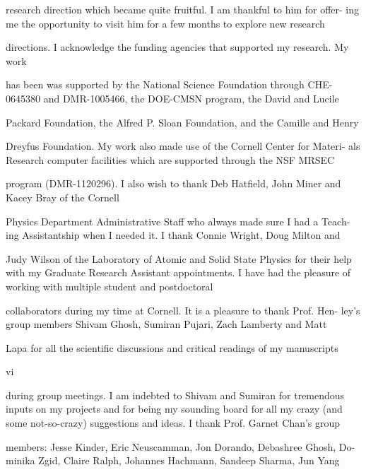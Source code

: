 \documentclass[phd,tocprelim]{cornell}
\begin{document}
\begin{acknowledgements}
research direction which became quite fruitful. I am thankful to him for offer-
ing me the opportunity to visit him for a few months to explore new research

directions.
I acknowledge the funding agencies that supported my research. My work

has been was supported by the National Science Foundation through CHE-
0645380 and DMR-1005466, the DOE-CMSN program, the David and Lucile

Packard Foundation, the Alfred P. Sloan Foundation, and the Camille and Henry

Dreyfus Foundation. My work also made use of the Cornell Center for Materi-
als Research computer facilities which are supported through the NSF MRSEC

program (DMR-1120296).
I also wish to thank Deb Hatfield, John Miner and Kacey Bray of the Cornell

Physics Department Administrative Staff who always made sure I had a Teach-
ing Assistantship when I needed it. I thank Connie Wright, Doug Milton and

Judy Wilson of the Laboratory of Atomic and Solid State Physics for their help
with my Graduate Research Assistant appointments.
I have had the pleasure of working with multiple student and postdoctoral

collaborators during my time at Cornell. It is a pleasure to thank Prof. Hen-
ley’s group members Shivam Ghosh, Sumiran Pujari, Zach Lamberty and Matt

Lapa for all the scientific discussions and critical readings of my manuscripts

vi

during group meetings. I am indebted to Shivam and Sumiran for tremendous
inputs on my projects and for being my sounding board for all my crazy (and
some not-so-crazy) suggestions and ideas. I thank Prof. Garnet Chan’s group

members: Jesse Kinder, Eric Neuscamman, Jon Dorando, Debashree Ghosh, Do-
minika Zgid, Claire Ralph, Johannes Hachmann, Sandeep Sharma, Jun Yang


\end{acknowledgements}
\end{document}
